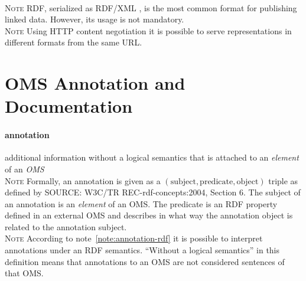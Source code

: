 \documentclass[10pt,%
\ifpretendfinal
final%
\else
draft%
\fi,
]{scrreprt}
\newcommand*{\termref}[1]{\textit{#1}}
\newcommand{\sclause}[1]{\section{#1}}
\newcommand{\termdefinition}[2]{\paragraph{#1} #2}
\newcommand{\nisref}[1]{#1}
\newenvironment{definitions}[0]{\medskip }{}
\newenvironment{note}[0]{\ \\ \textsc{Note} \quad}{}
\begin{document}
\begin{definitions}
  \begin{note}
    RDF, serialized as RDF/XML \cite{W3C:REC-rdf-syntax-grammar-20040210}, is the most common format for publishing linked data.  However, its usage is not mandatory.
  \end{note}
  \begin{note}
    Using HTTP content negotiation \cite{rfc2616} it is possible to serve representations in different formats from the same URL. 
  \end{note}
\end{definitions}

\sclause{OMS Annotation and Documentation}\label{c:terms-annotation}
 
\begin{definitions}
  \termdefinition{annotation}{additional information without a logical semantics that is attached to an \termref{element} of an \termref{OMS}}
  \begin{note}\label{note:annotation-rdf}
Formally, an annotation is given as a $(\text{subject}, \text{predicate}, \text{object})$ triple as 
defined by \nisref{SOURCE: W3C/TR REC-rdf-concepts:2004, Section 6}.  The subject of an annotation 
is an \termref{element} of an OMS.  The predicate is an RDF property defined in an external OMS and 
describes in what way the annotation object is related to the annotation subject.
  \end{note}  
  \begin{note}
According to note~\ref{note:annotation-rdf} it is possible to interpret annotations under an RDF 
semantics.  ``Without a logical semantics'' in this definition means that annotations to an OMS are 
not considered sentences of that OMS.
  \end{note}

  

\end{definitions}
\end{document}

